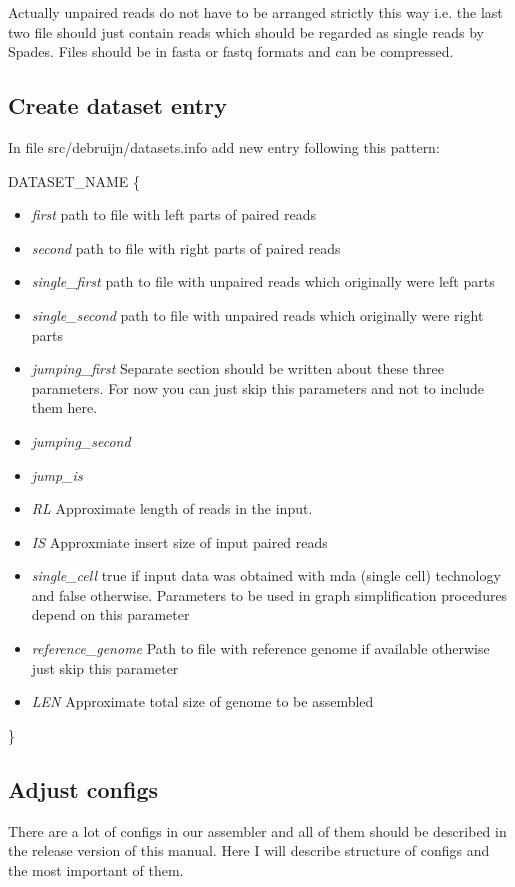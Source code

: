 \documentclass[a4paper,10pt]{article}
\begin{document}
Actually unpaired reads do not have to be arranged strictly this way i.e. the last two file should just contain reads which should be regarded as single reads by Spades.
Files should be in fasta or fastq formats and can be compressed.

\subsection{Create dataset entry}
In file src/debruijn/datasets.info add new entry following this pattern:

DATASET\_NAME
\{
\begin{itemize}
\item {\it first} path to file with left parts of paired reads
\item{\it second} path to file with right parts of paired reads
\item{\it single\_first} path to file with unpaired reads which originally were left parts
\item{\it single\_second} path to file with unpaired reads which originally were right parts
\item{\it jumping\_first} Separate section should be written about these three parameters. For now you can just skip this parameters and not to include them here.
\item{\it jumping\_second}
\item{\it jump\_is} 
\item{\it RL} Approximate length of reads in the input.
\item{\it IS} Approxmiate insert size of input paired reads
\item{\it single\_cell} true if input data was obtained with mda (single cell) technology and false otherwise. Parameters to be used in graph simplification procedures depend on this parameter
\item{\it reference\_genome} Path to file with reference genome if available otherwise just skip this parameter
\item{\it LEN} Approximate total size of genome to be assembled
\end{itemize}
\}

\subsection{Adjust configs}
There are a lot of configs in our assembler and all of them should be described in the release version of this manual. Here I will describe structure of configs and the most important of them.
\end{document}
